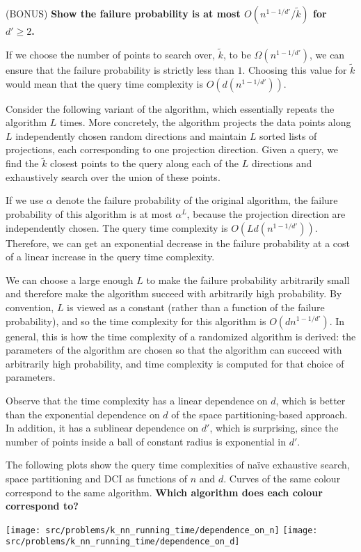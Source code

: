 \documentclass[preview]{standalone}
\begin{document}
\begin{Parts}
\Part (BONUS) {\bf Show the failure probability is at most $O\left(n^{1-1/d'}/\tilde{k}\right)$ for $d' \geq 2$.}



\Part If we choose the number of points to search over, $\tilde{k}$, to be $\Omega\left(n^{1-1/d'}\right)$, we can ensure that the failure probability is strictly less than $1$. Choosing this value for $\tilde{k}$ would mean that the query time complexity is $O(d(n^{1-1/d'}))$.

Consider the following variant of the algorithm, which essentially repeats the algorithm $L$ times. More concretely, the algorithm projects the data points along $L$ independently chosen random directions and maintain $L$ sorted lists of projections, each corresponding to one projection direction. Given a query, we find the $\tilde{k}$ closest points to the query along each of the $L$ directions and exhaustively search over the union of these points.

If we use $\alpha$ denote the failure probability of the original algorithm, the failure probability of this algorithm is at most $\alpha^{L}$, because the projection direction are independently chosen. The query time complexity is $O(Ld(n^{1-1/d'}))$. Therefore, we can get an exponential decrease in the failure probability at a cost of a linear increase in the query time complexity.

We can choose a large enough $L$ to make the failure probability arbitrarily small and therefore make the algorithm succeed with arbitrarily high probability. By convention, $L$ is viewed as a constant (rather than a function of the failure probability), and so the time complexity for this algorithm is $O(dn^{1-1/d'})$. In general, this is how the time complexity of a randomized algorithm is derived: the parameters of the algorithm are chosen so that the algorithm can succeed with arbitrarily high probability, and time complexity is computed for that choice of parameters.

Observe that the time complexity has a linear dependence on $d$, which is better than the exponential dependence on $d$ of the space partitioning-based approach. In addition, it has a sublinear dependence on $d'$, which is surprising, since the number of points inside a ball of constant radius is exponential in $d'$.

The following plots show the query time complexities of na\"{i}ve exhaustive search, space partitioning and DCI as functions of $n$ and $d$. Curves of the same colour correspond to the same algorithm. {\bf Which algorithm does each colour correspond to?}

\begin{center}
\texttt{[image: src/problems/k\_nn\_running\_time/dependence\_on\_n]}
\texttt{[image: src/problems/k\_nn\_running\_time/dependence\_on\_d]}
\end{center}




\end{Parts}
\end{document}
